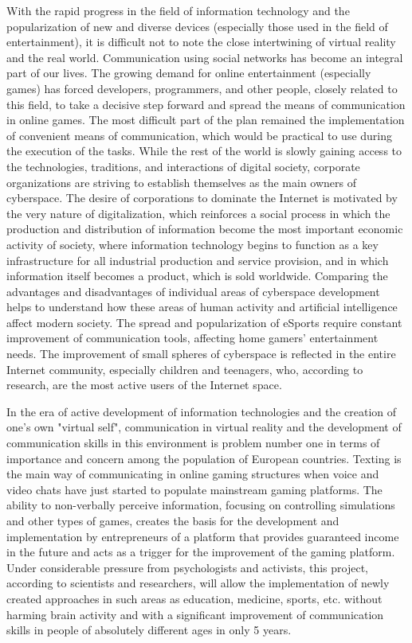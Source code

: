 \documentclass[10pt,twoside,slovak,a4paper]{article}
\begin{document}
  With the rapid progress in the field of information technology and the popularization of new and diverse devices (especially those used in the field of entertainment), it is difficult not to note the close intertwining of virtual reality and the real world. Communication using social networks has become an integral part of our lives. The growing demand for online entertainment (especially games) has forced developers, programmers, and other people, closely related to this field, to take a decisive step forward and spread the means of communication in online games. The most difficult part of the plan remained the implementation of convenient means of communication, which would be practical to use during the execution of the tasks. While the rest of the world is slowly gaining access to the technologies, traditions, and interactions of digital society, corporate organizations are striving to establish themselves as the main owners of cyberspace. The desire of corporations to dominate the Internet is motivated by the very nature of digitalization, which reinforces a social process in which the production and distribution of information become the most important economic activity of society, where information technology begins to function as a key infrastructure for all industrial production and service provision, and in which information itself becomes a product, which is sold worldwide. Comparing the advantages and disadvantages of individual areas of cyberspace development helps to understand how these areas of human activity and artificial intelligence affect modern society. The spread and popularization of eSports require constant improvement of communication tools, affecting home gamers' entertainment needs. The improvement of small spheres of cyberspace is reflected in the entire Internet community, especially children and teenagers, who, according to research, are the most active users of the Internet space.

  In the era of active development of information technologies and the creation of one's own "virtual self", communication in virtual reality and the development of communication skills in this environment is problem number one in terms of importance and concern among the population of European countries.  Texting is the main way of communicating in online gaming structures when voice and video chats have just started to populate mainstream gaming platforms. The ability to non-verbally perceive information, focusing on controlling simulations and other types of games, creates the basis for the development and implementation by entrepreneurs of a platform that provides guaranteed income in the future and acts as a trigger for the improvement of the gaming platform. Under considerable pressure from psychologists and activists, this project, according to scientists and researchers, will allow the implementation of newly created approaches in such areas as education, medicine, sports, etc. without harming brain activity and with a significant improvement of communication skills in people of absolutely different ages in only 5 years.
\end{document}
